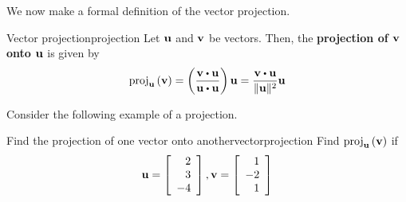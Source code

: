 We now make a formal definition of the vector projection.

\begin{definition}{Vector projection}{projection}
Let ${\bf u}$ and ${\bf v}$ be vectors. Then, the \textbf{projection of ${\bf v}$ onto
${\bf u}$} is given by 
\begin{equation*}
\func{proj}_{\vect{u}}\left( \vect{v}\right) =\left( \vspace{0.05in}
\frac{\vect{v}\dotprod \vect{u}}{\vect{u}\dotprod \vect{u}}\right) \vect{u}
=
\frac{\vect{v}\dotprod \vect{u}}{\vectlength \vect{u}\vectlength ^{2}}\vect{u}
\end{equation*}
\end{definition}

Consider the following example of a projection.

\begin{example}{Find the projection of one vector onto another}{vectorprojection}
Find 
$\mbox{proj}_{{\bf u}}\left( {\bf v}\right) $ if 
\begin{equation*}
{\bf u}=
\left[
\begin{array}{r}
2 \\
3 \\
-4
\end{array}
\right],
{\bf v}=
\left[
\begin{array}{r}
1 \\
-2 \\
1
\end{array}
\right]
\end{equation*}
\end{example}

